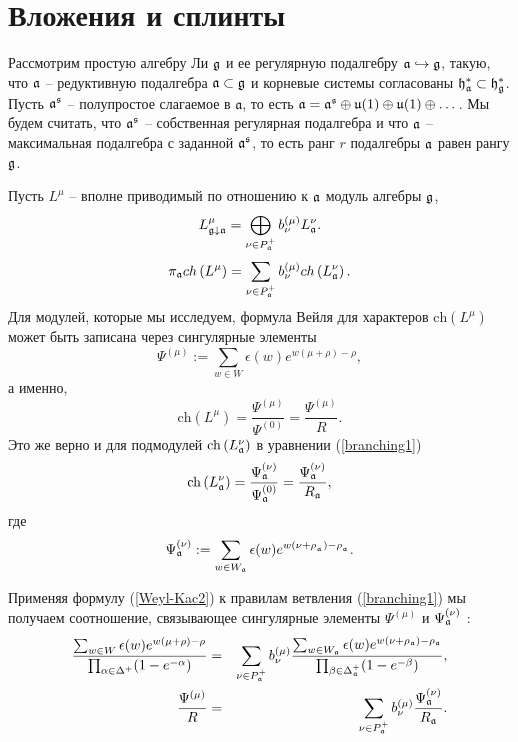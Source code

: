 \section{Вложения и сплинты}

\label{sec:Injections and splints}

Рассмотрим простую алгебру Ли $\mathfrak{g}$ и ее  регулярную подалгебру $\mathfrak{a} \hookrightarrow \mathfrak{g}$, такую, что $\mathfrak{a}$ -- редуктивную подалгебра $\mathfrak{a}\subset \mathfrak{g}$ и корневые системы согласованы $\mathfrak{h}_{\mathfrak{a}}^{\ast}\subset\mathfrak{h}_{\mathfrak{g}}^{\ast}$. Пусть $\mathfrak{a}^{\mathfrak{s}}$ -- полупростое слагаемое в $\mathfrak{a}$, то есть  $\mathfrak{a}=\mathfrak{a}^{\mathfrak{s}} \oplus \mathfrak{u}(1)\oplus \mathfrak{u}(1)\oplus \dots$. Мы будем считать, что $\mathfrak{a}^{\mathfrak{s}}$ -- собственная регулярная подалгебра и что $\mathfrak{a}$ -- максимальная подалгебра с заданной  $\mathfrak{a}^{\mathfrak{s}}$, то есть ранг $r$ подалгебры $\mathfrak{a}$ равен рангу $\mathfrak{g}$.


Пусть $L^{\mu }$ -- вполне приводимый по отношению к  $\mathfrak{a}$ модуль алгебры $\mathfrak{g}$,
\[
L_{\gf\downarrow \af}^{\mu }=\bigoplus\limits_{\nu \in P_{\af%
}^{+}}b_{\nu }^{\left( \mu \right) }L_{\af}^{\nu }.
\]
\begin{equation}
\pi _{\af}ch\left( L^{\mu }\right) =\sum_{\nu \in P_{\af%
}^{+}}b_{\nu }^{(\mu )}ch\left( L_{\af}^{\nu }\right) .
\label{branching1}
\end{equation}
Для модулей, которые мы исследуем, формула Вейля для характеров $\mathrm{ch}\left(L^{\mu }\right) $ может быть записана через сингулярные элементы \cite{humphreys1997introduction}
\[
\Psi ^{\left( \mu \right) }:=\sum\limits_{w\in W}\epsilon (w)e^{w(\mu +\rho
)-\rho },
\]
а именно,
\begin{equation}
\mathrm{ch}\left( L^{\mu }\right) =\frac{\Psi ^{\left( \mu \right) }}{\Psi
^{\left( 0\right) }}=\frac{\Psi ^{\left( \mu \right) }}{R}.
\label{Weyl-Kac2}
\end{equation}
Это же верно и для подмодулей $\mathrm{ch}\left( L_{\mathfrak{a}}^{\nu}\right) $ в уравнении (\ref{branching1})
\[
\mathrm{ch}\left( L_{\af}^{\nu }\right) =\frac{\Psi _{\af}^{\left(
\nu \right) }}{\Psi _{\af}^{\left( 0\right) }}=\frac{\Psi _{\af%
}^{\left( \nu \right) }}{R_{\af}},
\]
где
\[
\Psi _{\af}^{\left( \nu \right) }:=\sum\limits_{w\in W_{\af%
}}\epsilon (w)e^{w(\nu +\rho _{_{\af}})-\rho _{_{\af}}}.
\]

Применяя формулу (\ref{Weyl-Kac2}) к правилам ветвления (\ref{branching1}) мы получаем соотношение, связывающее сингулярные элементы $\Psi ^{\left( \mu\right) }$ и $\Psi _{\mathfrak{a}}^{\left( \nu \right) }$ :
\begin{eqnarray}
\frac{\sum_{w \in W}\epsilon (w )e^{w (\mu +\rho )-\rho }}{\prod_{\alpha \in
\Delta ^{+}}(1-e^{-\alpha })} &=&\sum_{\nu \in P_{\af}^{+}}b_{\nu
}^{(\mu )}\frac{\sum_{w \in W_{\af}}\epsilon (w )e^{w (\nu +\rho _{%
\af})-\rho _{\af}}}{\prod_{\beta \in \Delta _{\af%
}^{+}}(1-e^{-\beta })},  \nonumber  \label{eq:132} \\
\frac{\Psi ^{\left( \mu \right) }}{R} &=&\sum_{\nu \in P_{\af%
}^{+}}b_{\nu }^{(\mu )}\frac{\Psi _{\af}^{\left( \nu \right) }}{R_{%
\af}}.  \label{singular main}
\end{eqnarray}

